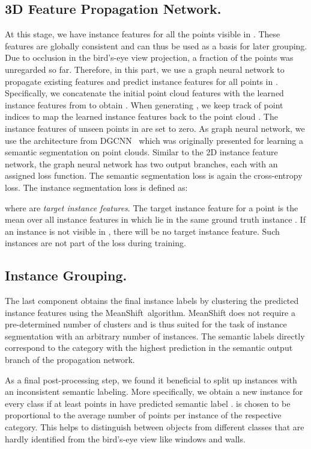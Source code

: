\documentclass[runningheads]{llncs}
\begin{document}
{\subsection{3D Feature Propagation Network.}
At this stage, we have instance features  for all the points  visible in .
These features are globally consistent and can thus be used as a basis for later grouping. Due to occlusion in the bird's-eye view projection, a fraction of the points was unregarded so far.
Therefore, in this part, we use a graph neural network to propagate existing features and predict instance features for all points in .
Specifically, we concatenate the initial point cloud features  with the learned instance features from  to obtain .
When generating , we keep track of point indices to map the learned instance features back to the point cloud .
The instance features of unseen points in  are set to zero.
As graph neural network, we use the architecture from DGCNN \,\cite{Wang18CoRR} which was originally presented for learning a semantic segmentation on point clouds. 
Similar to the 2D instance feature network, the graph neural network has two output branches, each with an assigned loss function. The semantic segmentation loss  is again the cross-entropy loss. The instance segmentation loss  is defined as:

where  are \emph{target instance features}.
The target instance feature for a point  is the mean over all instance features in  which lie in the same ground truth instance .
If an instance is not visible in , there will be no target instance feature. Such instances are not part of the loss during training.


\subsection{Instance Grouping.}
The last component obtains the final instance labels  by clustering the predicted instance features  using the MeanShift\,\cite{Comaniciu02PAMI} algorithm.
MeanShift does not require a pre-determined number of clusters and is thus suited for the task of instance segmentation with an arbitrary number of instances.
The semantic labels  directly correspond to the category with the highest prediction in the semantic output branch of the propagation network.

As a final post-processing step, we found it beneficial to split up instances with an inconsistent semantic labeling. 
More specifically, we obtain a new instance  for every class  if at least  points in  have predicted semantic label .  is chosen to be proportional to the average number of points per instance of the respective category.
This helps to distinguish between objects from different classes that are hardly identified from the bird's-eye view like windows and walls.


}
\end{document}
